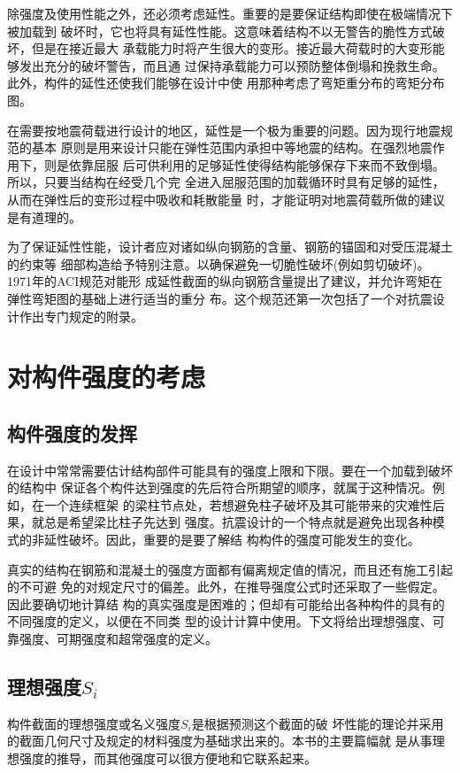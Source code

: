 \documentclass[12pt,a4paper]{book}
\begin{document}
除强度及使用性能之外，还必须考虑延性。重要的是要保证结构即使在极端情况下被加载到
破坏时，它也将具有延性性能。这意味着结构不以无警告的脆性方式破坏，但是在接近最大
承载能力时将产生很大的变形。接近最大荷载时的大变形能够发出充分的破坏警告，而且通
过保持承载能力可以预防整体倒塌和挽救生命。此外，构件的延性还使我们能够在设计中使
用那种考虑了弯矩重分布的弯矩分布图。

在需要按地震荷载进行设计的地区，延性是一个极为重要的问题。因为现行地震规范的基本
原则是用来设计只能在弹性范围内承担中等地震的结构。在强烈地震作用下，则是依靠屈服
后可供利用的足够延性使得结构能够保存下来而不致倒塌。所以，只要当结构在经受几个完
全进入屈服范围的加载循环时具有足够的延性，从而在弹性后的变形过程中吸收和耗散能量
时，才能证明对地震荷载所做的建议是有道理的。

为了保证延性性能，设计者应对诸如纵向钢筋的含量、钢筋的锚固和对受压混凝土的约束等
细部构造给予特别注意。以确保避免一切脆性破坏(例如剪切破坏)。1971年的ACI规范对能形
成延性截面的纵向钢筋含量提出了建议，并允许弯矩在弹性弯矩图的基础上进行适当的重分
布。这个规范还第一次包括了一个对抗震设计作出专门规定的附录。

\section{对构件强度的考虑}

\subsection{构件强度的发挥}

在设计中常常需要估计结构部件可能具有的强度上限和下限。要在一个加载到破坏的结构中
保证各个构件达到强度的先后符合所期望的顺序，就属于这种情况。例如，在一个连续框架
的梁柱节点处，若想避免柱子破坏及其可能带来的灾难性后果，就总是希望梁比柱子先达到
强度。抗震设计的一个特点就是避免出现各种模式的非延性破坏。因此，重要的是要了解结
构构件的强度可能发生的变化。

真实的结构在钢筋和混凝土的强度方面都有偏离规定值的情况，而且还有施工引起的不可避
免的对规定尺寸的偏差。此外，在推导强度公式时还采取了一些假定。因此要确切地计算结
构的真实强度是困难的；但却有可能给出各种构件的具有的不同强度的定义，以便在不同类
型的设计计算中使用。下文将给出理想强度、可靠强度、可期强度和超常强度的定义。

\subsection{理想强度$S_i$}构件截面的理想强度或名义强度$S_i$是根据预测这个截面的破
坏性能的理论并采用的截面几何尺寸及规定的材料强度为基础求出来的。本书的主要篇幅就
是从事理想强度的推导，而其他强度可以很方便地和它联系起来。
\end{document}
